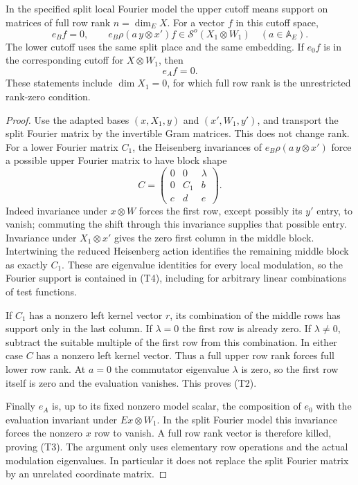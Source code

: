 \begin{srlemma}
\label{lem:sr-theta-cone-cutoff}
In the specified split local Fourier model the upper cutoff means
support on matrices of full row rank \(n=\dim_E X\).
For a vector \(f\) in this cutoff space,
\[
 e_Bf=0,\qquad
 e_B\rho(a\,y\otimes x')f\in\mathcal S^o(X_1\otimes W_1)
                 \quad(a\in\mathbb A_E).
 \tag{T2}\label{eq:sr-theta-cone-cutoff}
\]
The lower cutoff uses the same split place and the same embedding.
If \(e_0f\) is in the corresponding cutoff for \(X\otimes W_1\), then
\[
                         e_Af=0.                 \tag{T3}
 \label{eq:sr-theta-zero-A}
\]
These statements include \(\dim X_1=0\), for which full row rank is
the unrestricted rank-zero condition.
\end{srlemma}

\begin{proof}
Use the adapted bases
\((x,X_1,y)\) and \((x',W_1,y')\), and transport the split Fourier
matrix by the invertible Gram matrices. This does not change rank.
For a lower Fourier matrix \(C_1\), the Heisenberg invariances of
\(e_B\rho(a\,y\otimes x')\) force a possible upper Fourier matrix to
have block shape
\[
 C=\begin{pmatrix}
       0&0&\lambda\\
       0&C_1&b\\
       c&d&e
    \end{pmatrix}.                               \tag{T4}
 \label{eq:sr-theta-cone-cutoff-matrix}
\]
Indeed invariance under \(x\otimes W\) forces the first row, except
possibly its \(y'\) entry, to vanish; commuting the shift through this
invariance supplies that possible entry. Invariance under
\(X_1\otimes x'\) gives the zero first column in the middle block.
Intertwining the reduced Heisenberg action identifies the remaining
middle block as exactly \(C_1\). These are eigenvalue identities for
every local modulation, so the Fourier support is contained in (T4),
including for arbitrary linear combinations of test functions.

If \(C_1\) has a nonzero left kernel vector \(r\), its combination of
the middle rows has support only in the last column. If \(\lambda=0\)
the first row is already zero. If \(\lambda\ne0\), subtract the suitable
multiple of the first row from this combination. In either case
\(C\) has a nonzero left kernel vector. Thus a full upper row rank
forces full lower row rank. At \(a=0\) the commutator eigenvalue
\(\lambda\) is zero, so the first row itself is zero and the
evaluation vanishes. This proves (T2).

Finally \(e_A\) is, up to its fixed nonzero model scalar, the
composition of \(e_0\) with the evaluation invariant under
\(Ex\otimes W_1\). In the split Fourier model this invariance forces
the nonzero \(x\) row to vanish. A full row rank vector is therefore
killed, proving (T3). The argument only uses elementary row operations
and the actual modulation eigenvalues. In particular it does not
replace the split Fourier matrix by an unrelated coordinate matrix.
\end{proof}

